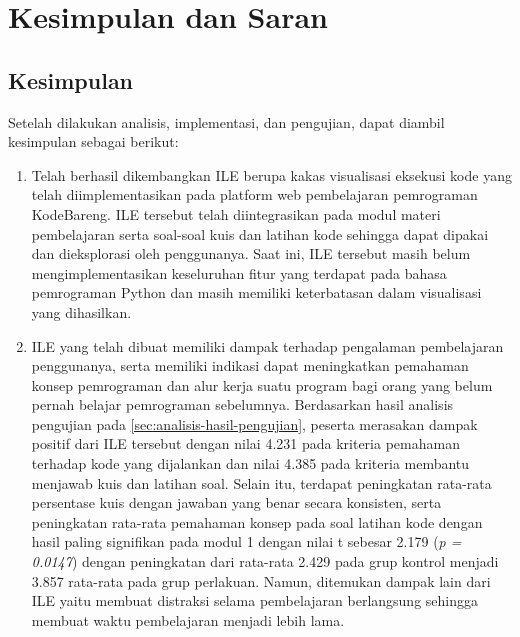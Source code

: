 \chapter{Kesimpulan dan Saran}


\section{Kesimpulan}
Setelah dilakukan analisis, implementasi, dan pengujian, dapat diambil kesimpulan sebagai berikut:
\begin{enumerate}
  \item Telah berhasil dikembangkan ILE berupa kakas visualisasi eksekusi kode yang telah diimplementasikan pada platform web pembelajaran pemrograman KodeBareng. ILE tersebut telah diintegrasikan pada modul materi pembelajaran serta soal-soal kuis dan latihan kode sehingga dapat dipakai dan dieksplorasi oleh penggunanya. Saat ini, ILE tersebut masih belum mengimplementasikan keseluruhan fitur yang terdapat pada bahasa pemrograman Python dan masih memiliki keterbatasan dalam visualisasi yang dihasilkan.
  \item ILE yang telah dibuat memiliki dampak terhadap pengalaman pembelajaran penggunanya, serta memiliki indikasi dapat meningkatkan pemahaman konsep pemrograman dan alur kerja suatu program bagi orang yang belum pernah belajar pemrograman sebelumnya. Berdasarkan hasil analisis pengujian pada \autoref{sec:analisis-hasil-pengujian}, peserta merasakan dampak positif dari ILE tersebut dengan nilai 4.231 pada kriteria pemahaman terhadap kode yang dijalankan dan nilai 4.385 pada kriteria membantu menjawab kuis dan latihan soal. Selain itu, terdapat peningkatan rata-rata persentase kuis dengan jawaban yang benar secara konsisten, serta peningkatan rata-rata pemahaman konsep pada soal latihan kode dengan hasil paling signifikan pada modul 1 dengan nilai t sebesar 2.179 (\textit{p = 0.0147}) dengan peningkatan dari rata-rata 2.429 pada grup kontrol menjadi 3.857 rata-rata pada grup perlakuan. Namun, ditemukan dampak lain dari ILE yaitu membuat distraksi selama pembelajaran berlangsung sehingga membuat waktu pembelajaran menjadi lebih lama.
\end{enumerate}

